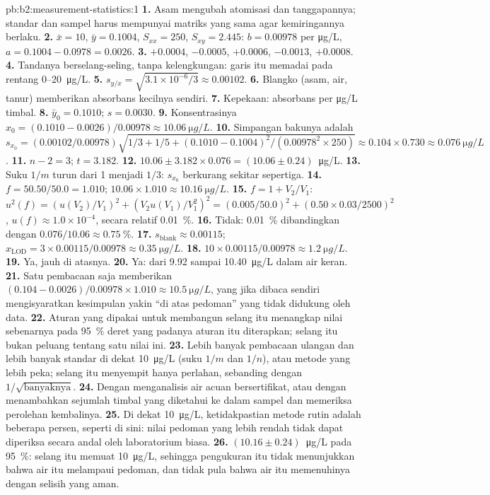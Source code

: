 \begin{solution}{pb:b2:measurement-statistics:1}
\textbf{1.} Asam mengubah atomisasi dan tanggapannya; standar dan sampel
harus mempunyai matriks yang sama agar kemiringannya berlaku.
\textbf{2.} $\bar x = 10$, $\bar y = 0.1004$, $S_{xx} = 250$, $S_{xy} = 2.445$: $b = 0.00978$ per
\unit{\micro g/L}, $a = 0.1004 - 0.0978 = 0.0026$.
\textbf{3.} $+0.0004$, $-0.0005$, $+0.0006$, $-0.0013$, $+0.0008$.
\textbf{4.} Tandanya berselang-seling, tanpa kelengkungan: garis itu memadai
pada rentang 0--\qty{20}{\micro g/L}.
\textbf{5.} $s_{y/x} = \sqrt{3.1 \times 10^{-6}/3} \approx 0.00102$.
\textbf{6.} Blangko (asam, air, tanur) memberikan absorbans kecilnya sendiri.
\textbf{7.} Kepekaan: absorbans per \unit{\micro g/L} timbal.
\textbf{8.} $\bar y_0 = 0.1010$; $s = 0.0030$.
\textbf{9.} Konsentrasinya $x_0 = (0.1010 - 0.0026)/0.00978 \approx \qty{10.06}{\micro g/L}$.
\textbf{10.} Simpangan bakunya adalah $s_{x_0} = (0.00102/0.00978)\sqrt{1/3 + 1/5 + (0.1010 - 0.1004)^2/(0.00978^2 \times 250)}
\approx 0.104 \times 0.730 \approx \qty{0.076}{\micro g/L}$.
\textbf{11.} $n - 2 = 3$; $t = 3.182$.
\textbf{12.} $10.06 \pm 3.182 \times 0.076 = (10.06 \pm 0.24)$~\unit{\micro g/L}.
\textbf{13.} Suku $1/m$ turun dari 1 menjadi $1/3$: $s_{x_0}$ berkurang sekitar sepertiga.
\textbf{14.} $f = 50.50/50.0 = 1.010$; $10.06 \times 1.010 \approx \qty{10.16}{\micro g/L}$.
\textbf{15.} $f = 1 + V_2/V_1$: $u^2(f) = (u(V_2)/V_1)^2 + (V_2u(V_1)/V_1^2)^2 = (0.005/50.0)^2 +
(0.50 \times 0.03/2500)^2$, $u(f) \approx 1.0 \times 10^{-4}$, secara relatif 0.01~\%.
\textbf{16.} Tidak: 0.01~\% dibandingkan dengan $0.076/10.06 \approx 0.75~\%$.
\textbf{17.} $s_{\mathrm{blank}} \approx 0.00115$; $x_{\mathrm{LOD}} = 3 \times 0.00115/0.00978 \approx
\qty{0.35}{\micro g/L}$.
\textbf{18.} $10 \times 0.00115/0.00978 \approx \qty{1.2}{\micro g/L}$.
\textbf{19.} Ya, jauh di atasnya.
\textbf{20.} Ya: dari 9.92 sampai \qty{10.40}{\micro g/L} dalam air keran.
\textbf{21.} Satu pembacaan saja memberikan $(0.104 - 0.0026)/0.00978 \times 1.010 \approx \qty{10.5}{\micro g/L}$,
yang jika dibaca sendiri mengisyaratkan kesimpulan yakin ``di atas
pedoman'' yang tidak didukung oleh data.
\textbf{22.} Aturan yang dipakai untuk membangun selang itu menangkap nilai
sebenarnya pada 95~\% deret yang padanya aturan itu diterapkan; selang itu
bukan peluang tentang satu nilai ini.
\textbf{23.} Lebih banyak pembacaan ulangan dan lebih banyak standar di
dekat \qty{10}{\micro g/L} (suku $1/m$ dan
$1/n$), atau metode yang lebih peka; selang itu menyempit hanya perlahan,
sebanding dengan $1/\sqrt{\text{banyaknya}}$.
\textbf{24.} Dengan menganalisis air acuan bersertifikat, atau dengan
menambahkan sejumlah timbal yang diketahui ke dalam sampel dan memeriksa
perolehan kembalinya.
\textbf{25.} Di dekat \qty{10}{\micro g/L}, ketidakpastian metode rutin
adalah beberapa persen, seperti di sini: nilai pedoman yang lebih rendah
tidak dapat diperiksa secara andal oleh laboratorium biasa.
\textbf{26.} $\boldsymbol{(10.16 \pm 0.24)}$~\unit{\micro g/L} pada 95~\%:
selang itu memuat \qty{10}{\micro g/L}, sehingga pengukuran itu tidak
menunjukkan bahwa air itu melampaui pedoman, dan tidak pula bahwa air itu
memenuhinya dengan selisih yang aman.
\end{solution}
